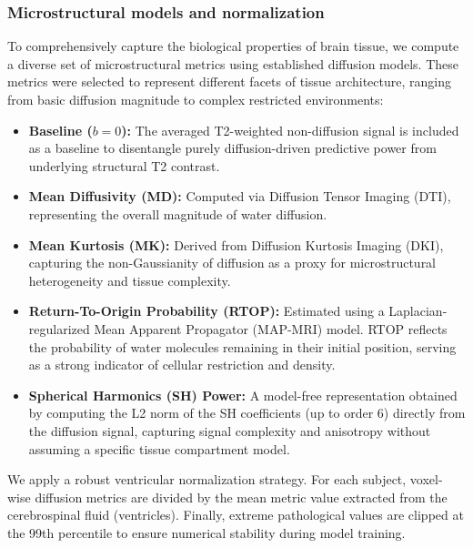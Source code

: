 \subsubsection{Microstructural models and normalization}
To comprehensively capture the biological properties of brain tissue, we compute a diverse set of 
microstructural metrics using established diffusion models. These metrics were selected to represent 
different facets of tissue architecture, ranging from basic diffusion magnitude to complex restricted 
environments:
\begin{itemize}
    \item \textbf{Baseline ($b=0$):} The averaged T2-weighted non-diffusion signal is included as a 
    baseline to disentangle purely diffusion-driven predictive power from underlying structural T2 
    contrast.
    \item \textbf{Mean Diffusivity (MD):} Computed via Diffusion Tensor Imaging (DTI), representing the overall magnitude of water diffusion.
    \item \textbf{Mean Kurtosis (MK):} Derived from Diffusion Kurtosis Imaging (DKI), capturing the 
    non-Gaussianity of diffusion as a proxy for microstructural heterogeneity and tissue complexity.
    \item \textbf{Return-To-Origin Probability (RTOP):} Estimated using a Laplacian-regularized Mean 
    Apparent Propagator (MAP-MRI) model. RTOP reflects the probability of water molecules remaining in 
    their initial position, serving as a strong indicator of cellular restriction and density.
    \item \textbf{Spherical Harmonics (SH) Power:} A model-free representation obtained by computing the 
    L2 norm of the SH coefficients (up to order 6) directly from the diffusion signal, capturing signal 
    complexity and anisotropy without assuming a specific tissue compartment model.
\end{itemize}
We apply a robust ventricular normalization strategy. For each subject, 
voxel-wise diffusion metrics are divided by the mean metric value extracted from the cerebrospinal 
fluid (ventricles). Finally, extreme pathological values are clipped at the 99th percentile to ensure 
numerical stability during model training.


